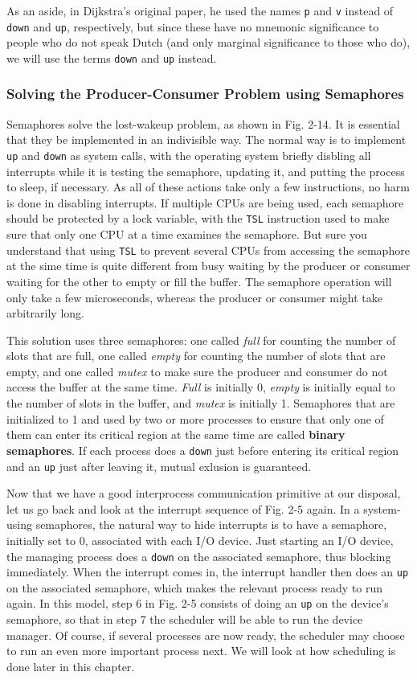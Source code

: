 \documentclass{book}
\newcommand {\kw}  [1] {\textbf{#1}}
\newcommand {\sys} [1] {\textsl{#1}}
\newcommand {\cmd} [1] {\texttt{#1}}
\begin{document}
As an aside, in Dijkstra's original paper, he used the names \cmd{p} and \cmd{v} instead of \cmd{down} and \cmd{up},
respectively, but since these have no mnemonic significance to people who do not speak Dutch (and only marginal significance to those who do),
we will use the terms \cmd{down} and \cmd{up} instead.

\subsubsection*{Solving the Producer-Consumer Problem using Semaphores}
Semaphores solve the lost-wakeup problem, as shown in Fig. 2-14.
It is essential that they be implemented in an indivisible way.
The normal way is to implement \cmd{up} and \cmd{down} as system calls,
with the operating system briefly disbling all interrupts while it is testing the semaphore,
updating it, and putting the process to sleep, if necessary.
As all of these actions take only a few instructions, no harm is done in disabling interrupts.
If multiple CPUs are being used, each semaphore should be protected by a lock variable, 
with the \cmd{TSL} instruction used to make sure that only one CPU at a time examines the semaphore.
But sure you understand that using \cmd{TSL} to prevent several CPUs from accessing the semaphore at the sime time 
is quite different from busy waiting by the producer or consumer waiting for the other to empty or fill the buffer.
The semaphore operation will only take a few microseconds, whereas the producer or consumer might take arbitrarily long.

This solution uses three semaphores: 
one called \sys{full} for counting the number of slots that are full,
one called \sys{empty} for counting the number of slots that are empty,
and one called \sys{mutex} to make sure the producer and consumer do not access the buffer at the same time.
\sys{Full} is initially 0, \sys{empty} is initially equal to the number of slots in the buffer,
and \sys{mutex} is initially 1.
Semaphores that are initialized to 1 and used by two or more processes to ensure that 
only one of them can enter its critical region at the same time are called \kw{binary semaphores}.
If each process does a \cmd{down} just before entering its critical region and an \cmd{up} just after leaving it, mutual exlusion is guaranteed.

Now that we have a good interprocess communication primitive at our disposal, 
let us go back and look at the interrupt sequence of Fig. 2-5 again. 
In a system-using semaphores, the natural way to hide interrupts is to have a semaphore, 
initially set to 0, associated with each I/O device.
Just starting an I/O device, the managing process does a \cmd{down} on the associated semaphore, thus blocking immediately.
When the interrupt comes in, the interrupt handler then does an \cmd{up} on the associated semaphore,
which makes the relevant process ready to run again.
In this model, step 6 in Fig. 2-5 consists of doing an \cmd{up} on the device's semaphore,
so that in step 7 the scheduler will be able to run the device manager.
Of course, if several processes are now ready, the scheduler may choose to run an even more important process next.
We will look at how scheduling is done later in this chapter.
\end{document}
